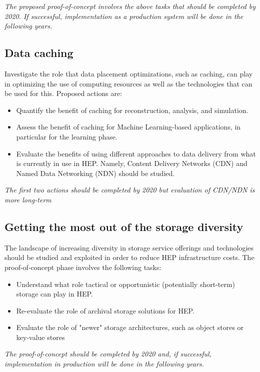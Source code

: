 \documentclass[12pt,a4paper]{article}
\begin{document}
\emph{The proposed proof-of-concept involves the above tasks that should be completed by 2020.
If successful, implementation as a production system will be done in the following years.}

\subsection{Data caching}\label{data-caching}
Investigate the role that data placement optimizations, such as caching, can play in optimizing
the use of computing resources as well as the technologies that can be used for this. Proposed actions are:

\begin{itemize}
\item Quantify the benefit of caching for reconstruction, analysis, and simulation.
\item Assess the benefit of caching for
  Machine Learning-based applications, in particular for the learning
  phase.
\item Evaluate the benefits of using different approaches to data delivery from what is currently in use in HEP.
Namely, Content Delivery Networks (CDN) and Named Data Networking (NDN) should be studied.
\end{itemize}

\emph{The first two actions should be completed by 2020 but evaluation of CDN/NDN is more long-term}

\subsection{Getting the most out of the
storage diversity}\label{storage-diversity}

The landscape of increasing diversity in storage service offerings and technologies should be studied and
exploited in order to reduce HEP infrastructure costs. The proof-of-concept phase involves the following tasks:

\begin{itemize}
\item Understand what role tactical or opportunistic (potentially short-term) storage can play in HEP.
\item Re-evaluate the role of archival storage solutions for HEP.
\item Evaluate the role of "newer" storage architectures, such as object stores or key-value stores
\end{itemize}

\emph{The  proof-of-concept should be completed by 2020 and, if successful, implementation in
production will be done in the following years.}
\end{document}
